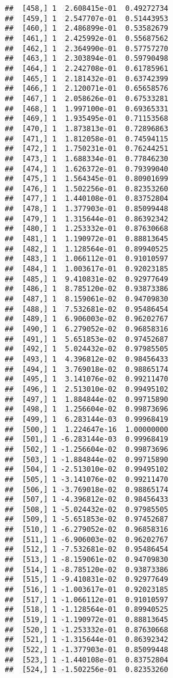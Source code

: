 \documentclass[
  12pt,
]{article}
\begin{document}
\begin{verbatim}
##  [458,] 1  2.608415e-01  0.49272734
##  [459,] 1  2.547707e-01  0.51443953
##  [460,] 1  2.486899e-01  0.53582679
##  [461,] 1  2.425992e-01  0.55687562
##  [462,] 1  2.364990e-01  0.57757270
##  [463,] 1  2.303894e-01  0.59790498
##  [464,] 1  2.242708e-01  0.61785961
##  [465,] 1  2.181432e-01  0.63742399
##  [466,] 1  2.120071e-01  0.65658576
##  [467,] 1  2.058626e-01  0.67533281
##  [468,] 1  1.997100e-01  0.69365331
##  [469,] 1  1.935495e-01  0.71153568
##  [470,] 1  1.873813e-01  0.72896863
##  [471,] 1  1.812058e-01  0.74594115
##  [472,] 1  1.750231e-01  0.76244251
##  [473,] 1  1.688334e-01  0.77846230
##  [474,] 1  1.626372e-01  0.79399040
##  [475,] 1  1.564345e-01  0.80901699
##  [476,] 1  1.502256e-01  0.82353260
##  [477,] 1  1.440108e-01  0.83752804
##  [478,] 1  1.377903e-01  0.85099448
##  [479,] 1  1.315644e-01  0.86392342
##  [480,] 1  1.253332e-01  0.87630668
##  [481,] 1  1.190972e-01  0.88813645
##  [482,] 1  1.128564e-01  0.89940525
##  [483,] 1  1.066112e-01  0.91010597
##  [484,] 1  1.003617e-01  0.92023185
##  [485,] 1  9.410831e-02  0.92977649
##  [486,] 1  8.785120e-02  0.93873386
##  [487,] 1  8.159061e-02  0.94709830
##  [488,] 1  7.532681e-02  0.95486454
##  [489,] 1  6.906003e-02  0.96202767
##  [490,] 1  6.279052e-02  0.96858316
##  [491,] 1  5.651853e-02  0.97452687
##  [492,] 1  5.024432e-02  0.97985505
##  [493,] 1  4.396812e-02  0.98456433
##  [494,] 1  3.769018e-02  0.98865174
##  [495,] 1  3.141076e-02  0.99211470
##  [496,] 1  2.513010e-02  0.99495102
##  [497,] 1  1.884844e-02  0.99715890
##  [498,] 1  1.256604e-02  0.99873696
##  [499,] 1  6.283144e-03  0.99968419
##  [500,] 1  1.224647e-16  1.00000000
##  [501,] 1 -6.283144e-03  0.99968419
##  [502,] 1 -1.256604e-02  0.99873696
##  [503,] 1 -1.884844e-02  0.99715890
##  [504,] 1 -2.513010e-02  0.99495102
##  [505,] 1 -3.141076e-02  0.99211470
##  [506,] 1 -3.769018e-02  0.98865174
##  [507,] 1 -4.396812e-02  0.98456433
##  [508,] 1 -5.024432e-02  0.97985505
##  [509,] 1 -5.651853e-02  0.97452687
##  [510,] 1 -6.279052e-02  0.96858316
##  [511,] 1 -6.906003e-02  0.96202767
##  [512,] 1 -7.532681e-02  0.95486454
##  [513,] 1 -8.159061e-02  0.94709830
##  [514,] 1 -8.785120e-02  0.93873386
##  [515,] 1 -9.410831e-02  0.92977649
##  [516,] 1 -1.003617e-01  0.92023185
##  [517,] 1 -1.066112e-01  0.91010597
##  [518,] 1 -1.128564e-01  0.89940525
##  [519,] 1 -1.190972e-01  0.88813645
##  [520,] 1 -1.253332e-01  0.87630668
##  [521,] 1 -1.315644e-01  0.86392342
##  [522,] 1 -1.377903e-01  0.85099448
##  [523,] 1 -1.440108e-01  0.83752804
##  [524,] 1 -1.502256e-01  0.82353260

\end{verbatim}
\end{document}
